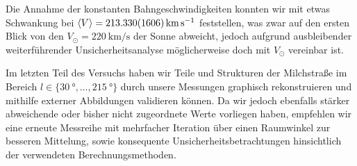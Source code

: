 \documentclass[../main.tex]{subfiles}
\begin{document}
    Die Annahme der konstanten Bahngeschwindigkeiten konnten wir mit etwas Schwankung bei $\langle V\rangle = \SI{213.33\pm1.606}{\km\per\s}$ feststellen, was zwar auf den ersten Blick von den $V_\odot = \SI{220}{\km\per\s}$ der Sonne abweicht, jedoch aufgrund ausbleibender weiterführender Unsicherheitsanalyse möglicherweise doch mit $V_\odot$ vereinbar ist.

    Im letzten Teil des Versuchs haben wir Teile und Strukturen der Milchstraße im Bereich $l\in\{\SI{30}{\degree},\ldots,\SI{215}{\degree}\}$ durch unsere Messungen graphisch rekonstruieren und mithilfe externer Abbildungen validieren können. Da wir jedoch ebenfalls stärker abweichende oder bisher nicht zugeordnete Werte vorliegen haben, empfehlen wir eine erneute Messreihe mit mehrfacher Iteration über einen Raumwinkel zur besseren Mittelung, sowie konsequente Unsicherheitsbetrachtungen hinsichtlich der verwendeten Berechnungsmethoden.   
\end{document}

